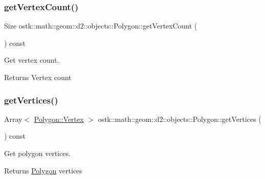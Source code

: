 \subsubsection{\texorpdfstring{get\+Vertex\+Count()}{getVertexCount()}}
{\footnotesize\ttfamily Size ostk\+::math\+::geom\+::d2\+::objects\+::\+Polygon\+::get\+Vertex\+Count (\begin{DoxyParamCaption}{ }\end{DoxyParamCaption}) const}



Get vertex count. 

\begin{DoxyReturn}{Returns}
Vertex count 
\end{DoxyReturn}
\mbox{\label{classostk_1_1math_1_1geom_1_1d2_1_1objects_1_1_polygon_a04a97204d397a1c7a919ebf4d73fb537}} 
\subsubsection{\texorpdfstring{get\+Vertices()}{getVertices()}}
{\footnotesize\ttfamily Array$<$ \hyperlink{classostk_1_1math_1_1geom_1_1d2_1_1objects_1_1_polygon_a2fdf6254b42f087bd9cd0b8b0d7df91c}{Polygon\+::\+Vertex} $>$ ostk\+::math\+::geom\+::d2\+::objects\+::\+Polygon\+::get\+Vertices (\begin{DoxyParamCaption}{ }\end{DoxyParamCaption}) const}



Get polygon vertices. 

\begin{DoxyReturn}{Returns}
\hyperlink{classostk_1_1math_1_1geom_1_1d2_1_1objects_1_1_polygon}{Polygon} vertices 
\end{DoxyReturn}
\mbox{\label{classostk_1_1math_1_1geom_1_1d2_1_1objects_1_1_polygon_a3be4f9a3cca08678f6050cdb8ae31618}} 
